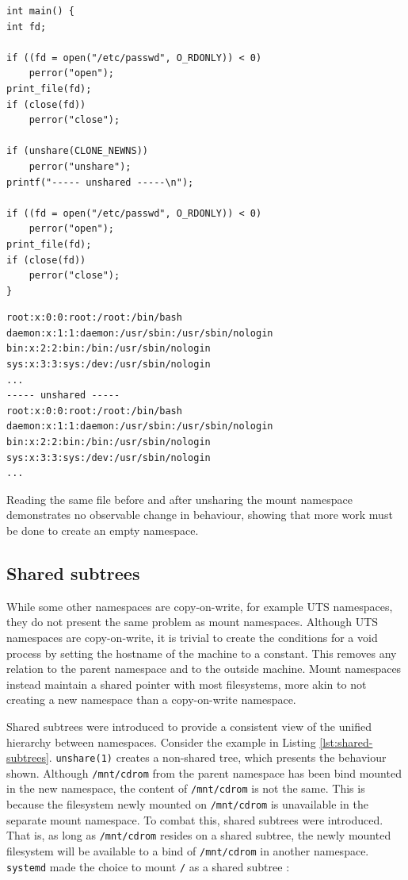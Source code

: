 \documentclass[12pt,a4paper,twoside]{report}
\begin{document}
\begin{listing}
\begin{verbatim}
int main() {
int fd;

if ((fd = open("/etc/passwd", O_RDONLY)) < 0)
    perror("open");
print_file(fd);
if (close(fd))
    perror("close");

if (unshare(CLONE_NEWNS))
    perror("unshare");
printf("----- unshared -----\n");

if ((fd = open("/etc/passwd", O_RDONLY)) < 0)
    perror("open");
print_file(fd);
if (close(fd))
    perror("close");
}
\end{verbatim}
\begin{verbatim}
root:x:0:0:root:/root:/bin/bash
daemon:x:1:1:daemon:/usr/sbin:/usr/sbin/nologin
bin:x:2:2:bin:/bin:/usr/sbin/nologin
sys:x:3:3:sys:/dev:/usr/sbin/nologin
...
----- unshared -----
root:x:0:0:root:/root:/bin/bash
daemon:x:1:1:daemon:/usr/sbin:/usr/sbin/nologin
bin:x:2:2:bin:/bin:/usr/sbin/nologin
sys:x:3:3:sys:/dev:/usr/sbin/nologin
...
\end{verbatim}

\caption{Reading the same file before and after unsharing the mount namespace demonstrates no observable change in behaviour, showing that more work must be done to create an empty namespace.}
\label{lst:unshare-cat-passwd}
\end{listing}

\subsection{Shared subtrees}
\label{sec:voiding-mount-shared-subtrees}

While some other namespaces are copy-on-write, for example UTS namespaces, they do not present the same problem as mount namespaces. Although UTS namespaces are copy-on-write, it is trivial to create the conditions for a void process by setting the hostname of the machine to a constant. This removes any relation to the parent namespace and to the outside machine. Mount namespaces instead maintain a shared pointer with most filesystems, more akin to not creating a new namespace than a copy-on-write namespace.

Shared subtrees \citep{pai_shared_2005} were introduced to provide a consistent view of the unified hierarchy between namespaces. Consider the example in Listing \ref{lst:shared-subtrees}. \texttt{unshare(1)} creates a non-shared tree, which presents the behaviour shown. Although \texttt{/mnt/cdrom} from the parent namespace has been bind mounted in the new namespace, the content of \texttt{/mnt/cdrom} is not the same. This is because the filesystem newly mounted on \texttt{/mnt/cdrom} is unavailable in the separate mount namespace. To combat this, shared subtrees were introduced. That is, as long as \texttt{/mnt/cdrom} resides on a shared subtree, the newly mounted filesystem will be available to a bind of \texttt{/mnt/cdrom} in another namespace. \texttt{systemd} made the choice to mount \texttt{/} as a shared subtree \citep{free_software_foundation_mount_namespaces7_2021}:
\end{document}
